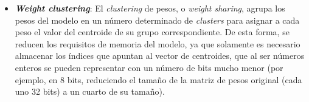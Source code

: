 \documentclass[a4paper, 11pt]{article}
\newcommand{\textbfit}[1]{\textbf{\textit{#1}}}
\begin{document}
\begin{itemize}
\begin{itemize}
    \end{itemize}
    \item \textbfit{Weight clustering}: El \textit{clustering} de pesos, o \textit{weight sharing}, agrupa los pesos del modelo en un número determinado de \textit{clusters} para asignar a cada peso el valor del centroide de su grupo correspondiente. De esta forma, se reducen los requisitos de memoria del modelo, ya que solamente es necesario almacenar los índices que apuntan al vector de centroides, que al ser números enteros se pueden representar con un número de bits mucho menor (por ejemplo, en 8 bits, reduciendo el tamaño de la matriz de pesos original (cada uno 32 bits) a un cuarto de su tamaño).
    

\end{itemize}
\end{document}
